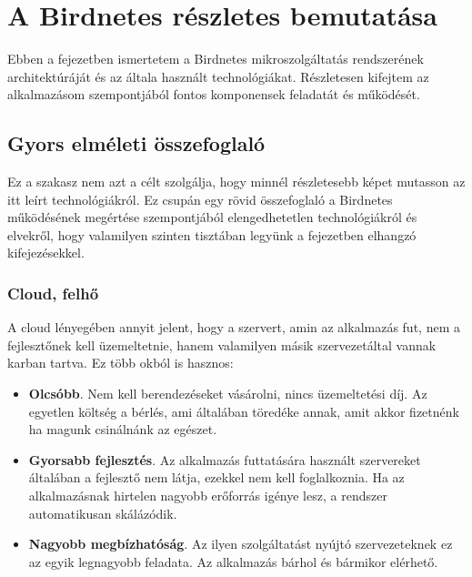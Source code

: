 \chapter{A Birdnetes részletes bemutatása}
\label{chapt:birdnetes-introduction}
Ebben a fejezetben ismertetem a Birdnetes mikroszolgáltatás rendszerének architektúráját és az általa használt technológiákat.
Részletesen kifejtem az alkalmazásom szempontjából fontos komponensek feladatát és működését.

\section{Gyors elméleti összefoglaló}
Ez a szakasz nem azt a célt szolgálja, hogy minnél részletesebb képet mutasson az itt leírt technológiákról.
Ez csupán egy rövid összefoglaló a Birdnetes működésének megértése szempontjából elengedhetetlen technológiákról és elvekről,
hogy valamilyen szinten tisztában legyünk a fejezetben elhangzó kifejezésekkel.

\subsection{Cloud, felhő}
A cloud lényegében annyit jelent, hogy a szervert, amin az alkalmazás fut, nem a fejlesztőnek kell üzemeltetnie,
hanem valamilyen másik szervezet\footnotemark által vannak karban tartva. 
Ez több okból is hasznos:
\begin{itemize}
    \item \textbf{Olcsóbb}. Nem kell berendezéseket vásárolni, nincs üzemeltetési díj. Az egyetlen költség a bérlés, ami általában töredéke annak, amit akkor fizetnénk ha magunk csinálnánk az egészet.
    \item \textbf{Gyorsabb fejlesztés}. Az alkalmazás futtatására használt szervereket általában a fejlesztő nem látja, ezekkel nem kell foglalkoznia. Ha az alkalmazásnak hirtelen nagyobb erőforrás igénye lesz, a rendszer automatikusan skálázódik.
    \item \textbf{Nagyobb megbízhatóság}. Az ilyen szolgáltatást nyújtó szervezeteknek ez az egyik legnagyobb feladata. Az alkalmazás bárhol és bármikor elérhető.
\end{itemize}

